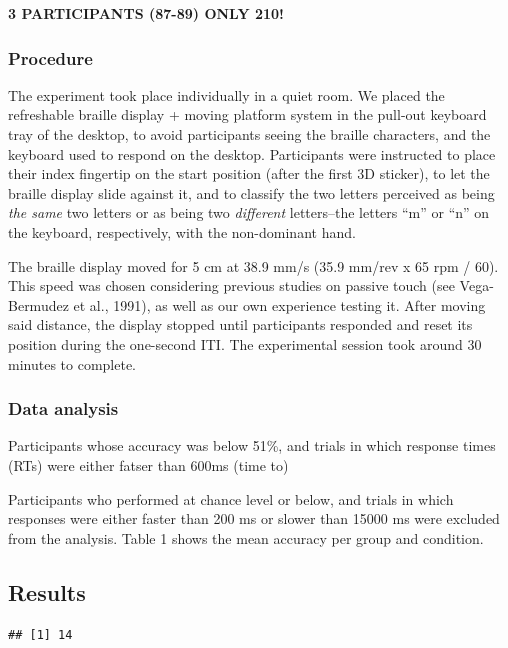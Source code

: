 \documentclass[english,man]{apa7}
\begin{document}
\textbf{3 PARTICIPANTS (87-89) ONLY 210!}

\hypertarget{procedure}{%
\subsubsection{Procedure}\label{procedure}}

The experiment took place individually in a quiet room. We placed the refreshable braille display + moving platform system in the pull-out keyboard tray of the desktop, to avoid participants seeing the braille characters, and the keyboard used to respond on the desktop. Participants were instructed to place their index fingertip on the start position (after the first 3D sticker), to let the braille display slide against it, and to classify the two letters perceived as being \emph{the same} two letters or as being two \emph{different} letters--the letters \enquote{m} or \enquote{n} on the keyboard, respectively, with the non-dominant hand.

The braille display moved for 5 cm at 38.9 mm/s (35.9 mm/rev x 65 rpm / 60). This speed was chosen considering previous studies on passive touch (see Vega-Bermudez et al., 1991), as well as our own experience testing it. After moving said distance, the display stopped until participants responded and reset its position during the one-second ITI. The experimental session took around 30 minutes to complete.

\hypertarget{data-analysis}{%
\subsubsection{Data analysis}\label{data-analysis}}

Participants whose accuracy was below 51\%, and trials in which response times (RTs) were either fatser than 600ms (time to)

Participants who performed at chance level or below, and trials in which responses were either faster than 200 ms or slower than 15000 ms were excluded from the analysis. Table 1 shows the mean accuracy per group and condition.

\hypertarget{results}{%
\subsection{Results}\label{results}}

\begin{verbatim}
## [1] 14
\end{verbatim}
\end{document}

